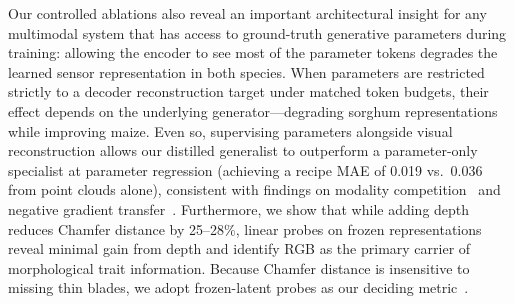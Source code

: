\documentclass[10pt,twocolumn,letterpaper]{article}
\begin{document}
Our controlled ablations also reveal an important architectural insight for any multimodal system that has access to ground-truth generative parameters during training: allowing the encoder to see most of the parameter tokens degrades the learned sensor representation in both species. When parameters are restricted strictly to a decoder reconstruction target under matched token budgets, their effect depends on the underlying generator---degrading sorghum representations while improving maize. Even so, supervising parameters alongside visual reconstruction allows our distilled generalist to outperform a parameter-only specialist at parameter regression (achieving a recipe MAE of 0.019 vs.\ 0.036 from point clouds alone), consistent with findings on modality competition~\citep{peng2022ogm} and negative gradient transfer~\citep{yu2020pcgrad}. Furthermore, we show that while adding depth reduces Chamfer distance by 25--28\%, linear probes on frozen representations reveal minimal gain from depth and identify RGB as the primary carrier of morphological trait information. Because Chamfer distance is insensitive to missing thin blades, we adopt frozen-latent probes as our deciding metric~\citep{chen2020simclr,wu2021dcd}.
\end{document}
